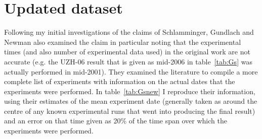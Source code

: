 \documentclass[page-classic]{epl2}
\begin{document}
\section{Updated dataset}

Following my initial investigations of the claims of \cite{2015EL....11010002A} Schlamminger, Gundlach and Newman
also examined the claim \cite{2015arXiv150501774S} in particular noting that the experimental times (and also number 
of experimental data used) in the original work are not accurate (e.g. the UZH-06 result that is given as
mid-2006 in table~\ref{tab:Gs} was actually performed in mid-2001). They examined the literature
to compile a more complete list of experiments with information on the actual dates that the experiments were
performed. In table~\ref{tab:Gsnew} I reproduce their information, using their estimates of the mean experiment
date (generally taken as around the centre of any known experimental runs that went into producing the final result)
and an error on that time given as 20\% of the time span over which the experiments were performed.
\end{document}
